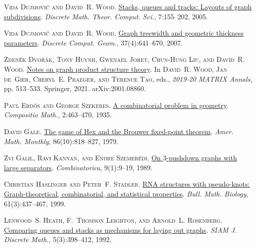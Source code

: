\documentclass[kpfonts]{patmorin}
\begin{document}
\begin{thebibliography}{44}
	\textsc{Vida Dujmovi{\'c} and David~R. Wood}.
	\newblock \href{http://dmtcs.episciences.org/346}{Stacks, queues and tracks:
		Layouts of graph subdivisions}.
	\newblock \emph{Discrete Math. Theor. Comput. Sci.}, 7:155--202, 2005.

	\textsc{Vida Dujmovi{\'c} and David~R. Wood}.
	\newblock \href{https://doi.org/10.1007/s00454-007-1318-7}{Graph treewidth and
		geometric thickness parameters}.
	\newblock \emph{Discrete Comput. Geom.}, 37(4):641--670, 2007.

	\textsc{Zden{\v{e}}k Dvo{\v{r}}{\'a}k, Tony Huynh, Gwena\"el Joret, Chun-Hung
		Liu, and David~R. Wood}.
	\newblock \href{https://doi.org/10.1007/978-3-030-62497-2_32}{Notes on graph
		product structure theory}.
	\newblock In \textsc{David~R. Wood, Jan de~Gier, Cheryl~E. Praeger, and Terence
		Tao}, eds., \emph{2019-20 MATRIX Annals}, pp. 513--533. Springer, 2021.
	\newblock arXiv:2001.08860.

	\textsc{Paul Erd\H{o}s and George Szekeres}.
	\newblock \href{http://www.numdam.org/item?id=CM_1935__2__463_0}{A
		combinatorial problem in geometry}.
	\newblock \emph{Compositio Math.}, 2:463--470, 1935.

	\textsc{David Gale}.
	\newblock \href{https://doi.org/10.2307/2320146}{The game of {H}ex and the
		{B}rouwer fixed-point theorem}.
	\newblock \emph{Amer. Math. Monthly}, 86(10):818--827, 1979.

	\textsc{Zvi Galil, Ravi Kannan, and Endre Szemer\'{e}di}.
	\newblock \href{https://doi.org/10.1007/BF02122679}{On $3$-pushdown graphs with
		large separators}.
	\newblock \emph{Combinatorica}, 9(1):9--19, 1989.

	\textsc{Christian Haslinger and Peter~F. Stadler}.
	\newblock \href{https://doi.org/10.1006/bulm.1998.0085}{{RNA} structures with
		pseudo-knots: {G}raph-theoretical, combinatorial, and statistical
		properties}.
	\newblock \emph{Bull. Math. Biology}, 61(3):437--467, 1999.

	\textsc{Lenwood~S. Heath, F.~Thomson Leighton, and Arnold~L. Rosenberg}.
	\newblock \href{https://doi.org/10.1137/0405031}{Comparing queues and stacks as
		mechanisms for laying out graphs}.
	\newblock \emph{SIAM J. Discrete Math.}, 5(3):398--412, 1992.


\end{thebibliography}
\end{document}

